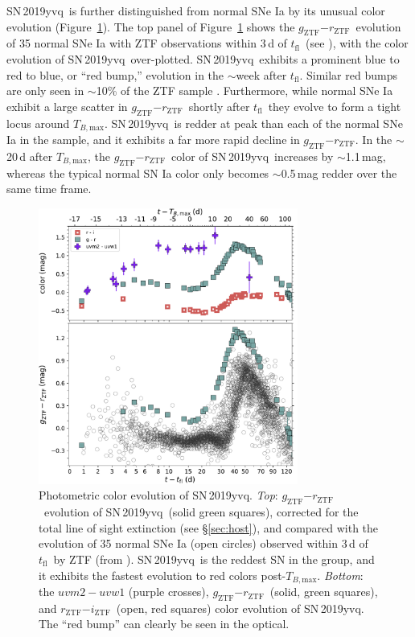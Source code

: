 \documentclass[twocolumn]{aastex63}
\newcommand{\rztf}{$r_\mathrm{ZTF}$}
\newcommand{\gztf}{$g_\mathrm{ZTF}$}
\newcommand{\iztf}{$i_\mathrm{ZTF}$}
\newcommand{\tfl}{$t_\mathrm{fl}$}
\newcommand{\tbmax}{$T_{B,\mathrm{max}}$}
\newcommand{\sn}{SN\,2019yvq}
\begin{document}
\sn\ is further distinguished from normal SNe Ia by its unusual color
evolution (Figure~\ref{fig:colors}). The top panel of Figure~\ref{fig:colors}
shows the \gztf$ - $\rztf\ evolution of 35 normal SNe Ia with ZTF
observations within 3\,d of \tfl\ (see \citealt{Bulla20}), with the color
evolution of \sn\ over-plotted. \sn\ exhibits a prominent blue to red to
blue, or ``red bump,'' evolution in the $\sim$week after \tfl. Similar red
bumps are only seen in $\sim$10\% of the ZTF sample \citep{Bulla20}.
Furthermore, while normal SNe Ia exhibit a large scatter in \gztf$ - $\rztf\
shortly after \tfl\ they evolve to form a tight locus around \tbmax. \sn\ is
redder at peak than each of the normal SNe Ia in the \citet{Bulla20} sample,
and it exhibits a far more rapid decline in \gztf$ - $\rztf. In the
$\sim$20\,d after \tbmax, the \gztf$ - $\rztf\ color of \sn\ increases by
$\sim$1.1\,mag, whereas the typical normal SN Ia color only becomes
$\sim$0.5\,mag redder over the same time frame. 

\begin{figure}
    \centering
    \includegraphics[width=3.35in]{./figures/P48_colors.pdf}
    \caption{Photometric color evolution of \sn. \textit{Top}: \gztf$ -
    $\rztf\ evolution of \sn\ (solid green squares), corrected for the total
    line of sight extinction (see \S\ref{sec:host}), and compared with the
    evolution of 35 normal SNe Ia (open circles) observed within 3\,d of
    \tfl\ by ZTF (from \citealt{Bulla20}). \sn\ is the reddest SN in the
    group, and it exhibits the fastest evolution to red colors post-\tbmax.
    \textit{Bottom}: the $uvm2 - uvw1$ (purple crosses), \gztf$ - $\rztf\
    (solid, green squares), and \rztf$ - $\iztf\ (open, red squares) color
    evolution of \sn. The ``red bump'' can clearly be seen in the
    optical.}
    \label{fig:colors}
\end{figure}
\end{document}
